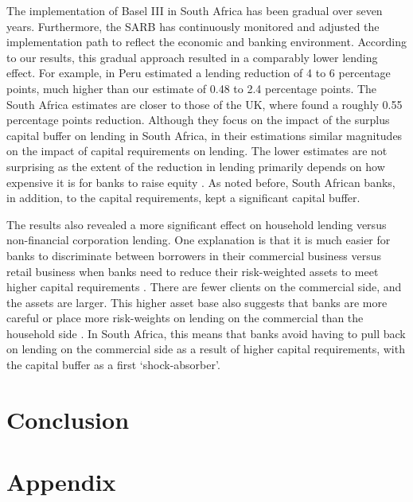 \documentclass[
  12,
]{article}
\begin{document}
The implementation of Basel III in South Africa has been gradual over seven years. Furthermore, the SARB has continuously monitored and adjusted the implementation path to reflect the economic and banking environment. According to our results, this gradual approach resulted in a comparably lower lending effect. For example, in Peru \citet{fang2020bank} estimated a lending reduction of 4 to 6 percentage points, much higher than our estimate of 0.48 to 2.4 percentage points. The South Africa estimates are closer to those of the UK, where \citet{aiyar2016does} found a roughly 0.55 percentage points reduction. Although they focus on the impact of the surplus capital buffer on lending in South Africa, in their estimations \citet{neryvia2023} similar magnitudes on the impact of capital requirements on lending. The lower estimates are not surprising as the extent of the reduction in lending primarily depends on how expensive it is for banks to raise equity \citep{aiyar2016does}. As noted before, South African banks, in addition, to the capital requirements, kept a significant capital buffer.

The results also revealed a more significant effect on household lending versus non-financial corporation lending. One explanation is that it is much easier for banks to discriminate between borrowers in their commercial business versus retail business when banks need to reduce their risk-weighted assets to meet higher capital requirements \citep{de2020bank}. There are fewer clients on the commercial side, and the assets are larger. This higher asset base also suggests that banks are more careful or place more risk-weights on lending on the commercial than the household side \citep{imbierowicz2018time}. In South Africa, this means that banks avoid having to pull back on lending on the commercial side as a result of higher capital requirements, with the capital buffer as a first `shock-absorber'.

\newpage

\hypertarget{conclusion}{%
\section{Conclusion}\label{conclusion}}

\newpage

\newpage

\hypertarget{appendix}{%
\section{Appendix}\label{appendix}}
\end{document}
